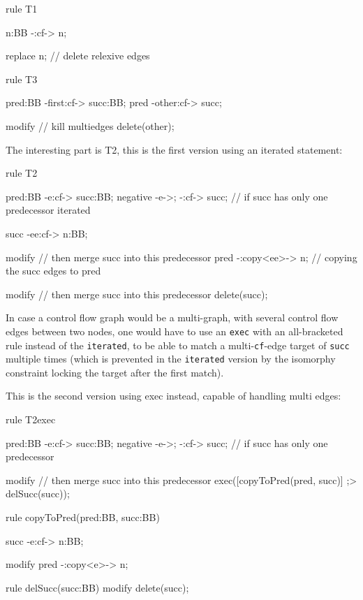   \begin{example}
    \begin{grgen}
rule T1
{
  n:BB -:cf-> n;
  
  replace {
    n; // delete relexive edges
  }
}

rule T3
{
  pred:BB -first:cf-> succ:BB;
  pred    -other:cf-> succ;
  
  modify { // kill multiedges
    delete(other);
  }
}
    \end{grgen}
  \end{example}

The interesting part is T2, this is the first version using an iterated statement:

  \begin{example}
    \begin{grgen}
rule T2
{
  pred:BB -e:cf-> succ:BB;
  negative {
    -e->;
    -:cf-> succ; // if succ has only one predecessor
  }
  iterated {
    succ -ee:cf-> n:BB;
    
    modify { // then merge succ into this predecessor
      pred -:copy<ee>-> n; // copying the succ edges to pred
    }
  }
  
  modify { // then merge succ into this predecessor
    delete(succ);
  }
}
    \end{grgen}
  \end{example}

In case a control flow graph would be a multi-graph, with several control flow edges between two nodes, one would have to use an \texttt{exec} with an all-bracketed rule instead of the \texttt{iterated}, to be able to match a multi-\texttt{cf}-edge target of \texttt{succ} multiple times (which is prevented in the \texttt{iterated} version by the isomorphy constraint locking the target after the first match).

This is the second version using exec instead, capable of handling multi edges:

  \begin{example}
    \begin{grgen}
rule T2exec
{
  pred:BB -e:cf-> succ:BB;
  negative {
    -e->;
    -:cf-> succ; // if succ has only one predecessor
  }
  
  modify { // then merge succ into this predecessor
    exec([copyToPred(pred, succ)] ;> delSucc(succ));
  }
}

rule copyToPred(pred:BB, succ:BB)
{
  succ -e:cf-> n:BB;
  
  modify {
    pred -:copy<e>-> n;
  }
}

rule delSucc(succ:BB)
{
  modify {
    delete(succ);
  }
}
    \end{grgen}
  \end{example}

